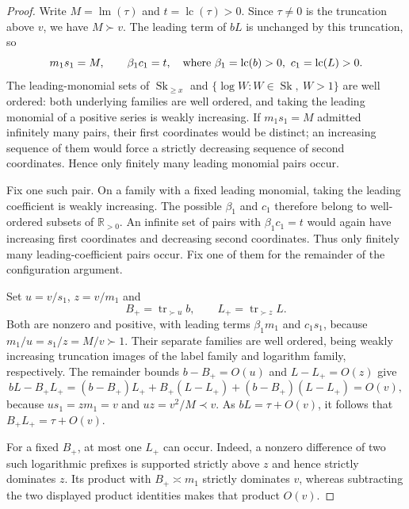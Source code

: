 \documentclass[11pt]{article}
\theoremstyle{definition}
\theoremstyle{remark}
\newcommand{\Sk}{\operatorname{Sk}}
\newcommand{\R}{\mathbb R}
\newcommand{\arch}{\mathrel{\asymp}}
\newcommand{\tr}{\operatorname{tr}}
\newcommand{\lm}{\operatorname{lm}}
\newcommand{\lc}{\operatorname{lc}}
\numberwithin{equation}{section}
\begin{document}
\begin{proof}
Write $M=\lm(\tau)$ and $t=\lc(\tau)>0$.
Since $\tau\ne0$ is the truncation above $v$, we have $M\succ v$.
The leading term of $bL$ is unchanged by this truncation, so
\[
 m_1s_1=M,\qquad \beta_1c_1=t,
 \quad\hbox{where }\beta_1=\lc(b)>0,
                         \ c_1=\lc(L)>0.
\]
The leading-monomial sets of $\Sk_{\ge x}$ and
$\{\log W:W\in\Sk,\ W>1\}$ are well ordered: both underlying
families are well ordered, and taking the leading monomial of a
positive series is weakly increasing.  If $m_1s_1=M$ admitted
infinitely many pairs, their first coordinates would be distinct;
an increasing sequence of them would force a strictly decreasing
sequence of second coordinates.  Hence only finitely many leading
monomial pairs occur.

Fix one such pair.  On a family with a fixed leading monomial,
taking the leading coefficient is weakly increasing.  The possible
$\beta_1$ and $c_1$ therefore belong to well-ordered subsets of
$\R_{>0}$.  An infinite set of pairs with $\beta_1c_1=t$ would
again have increasing first coordinates and decreasing second
coordinates.  Thus only finitely many leading-coefficient pairs
occur.  Fix one of them for the remainder of the configuration
argument.

Set $u=v/s_1$, $z=v/m_1$ and
\[
 B_+=\tr_{\succ u}b,\qquad L_+=\tr_{\succ z}L.
\]
Both are nonzero and positive, with leading terms
$\beta_1m_1$ and $c_1s_1$, because
$m_1/u=s_1/z=M/v\succ1$.  Their separate families are well
ordered, being weakly increasing truncation images of the label
family and logarithm family, respectively.  The remainder bounds
$b-B_+=O(u)$ and $L-L_+=O(z)$ give
\[
 bL-B_+L_+
 =(b-B_+)L_++B_+(L-L_+)+(b-B_+)(L-L_+)=O(v),
\]
because $us_1=zm_1=v$ and $uz=v^2/M\prec v$.
As $bL=\tau+O(v)$, it follows that
$B_+L_+=\tau+O(v)$.

For a fixed $B_+$, at most one $L_+$ can occur.  Indeed, a
nonzero difference of two such logarithmic prefixes is supported
strictly above $z$ and hence strictly dominates $z$.  Its product
with $B_+\arch m_1$ strictly dominates $v$, whereas subtracting
the two displayed product identities makes that product $O(v)$.


\end{proof}
\end{document}
